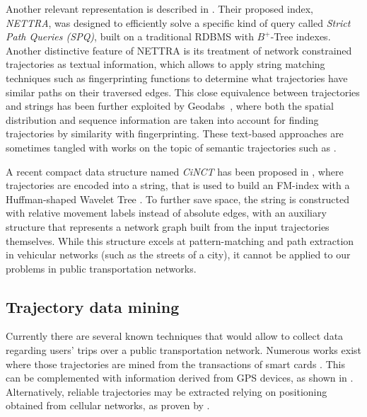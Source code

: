 \documentclass[runningheads]{llncs}
\begin{document}
Another relevant representation is described in \cite{DBLP:conf/gis/KroghPTT14}. Their proposed index, {\em NETTRA}, was designed to efficiently solve a specific kind of query called {\em Strict Path Queries (SPQ)}, built on a traditional RDBMS with $B^+$-Tree indexes. Another distinctive feature of NETTRA is its treatment of network constrained trajectories as textual information, which allows to apply string matching techniques such as fingerprinting functions to determine what trajectories have similar paths on their traversed edges. This close equivalence between trajectories and strings has been further exploited by Geodabs~\cite{chapuis2018geodabs}, where both the spatial distribution and sequence information are taken into account for finding trajectories by similarity with fingerprinting. These text-based approaches are sometimes tangled with works on the topic of semantic trajectories such as \cite{al2017semantictraj}.


A recent compact data structure named {\em CiNCT} has been proposed in \cite{koide2018cinct}, where trajectories are encoded into a string, that is used to build an FM-index \cite{DBLP:conf/focs/FerraginaM00} with a Huffman-shaped Wavelet Tree \cite{ferragina2009compressed}. To further save space, the string is constructed with relative movement labels instead of absolute edges, with an auxiliary structure that represents a network graph built from the input trajectories themselves. While this structure excels at pattern-matching and path extraction in vehicular networks (such as the streets of a city), it cannot be applied to our problems in public transportation networks.

\subsection{Trajectory data mining}
Currently there are several known techniques that would allow to collect data regarding users' trips over a public transportation network. Numerous works exist where those trajectories are mined from the transactions of smart cards \cite{bhaskar2015passenger,wang2014aggregated}. This can be complemented with information derived from GPS devices, as shown in \cite{ma2014development}. Alternatively, reliable trajectories may be extracted relying on positioning obtained from cellular networks, as proven by \cite{liu2017exploring}.
\end{document}
